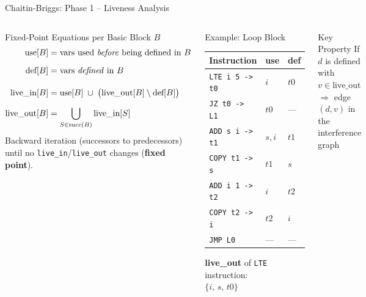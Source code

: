 \documentclass[aspectratio=169,11pt]{beamer}
\begin{document}
\begin{frame}{Chaitin-Briggs: Phase 1 -- Liveness Analysis}
\begin{columns}[t]
  \begin{block}{Fixed-Point Equations per Basic Block $B$}
    \bigskip
    \begin{align*}
      \text{use}[B]        &= \text{vars used \emph{before} being defined in }B\\[6pt]
      \text{def}[B]        &= \text{vars \emph{defined} in }B\\[10pt]
      \text{live\_in}[B]  &= \text{use}[B] \;\cup\;
                              \bigl(\text{live\_out}[B] \setminus \text{def}[B]\bigr)\\[6pt]
      \text{live\_out}[B] &= \bigcup_{S \in \text{succ}(B)} \text{live\_in}[S]
    \end{align*}
    \bigskip
    Backward iteration (successors to predecessors)\\
    until no \texttt{live\_in}/\texttt{live\_out} changes (\textbf{fixed point}).
  \end{block}

  \begin{exampleblock}{Example: Loop Block}
    \small
    \begin{tabular}{lll}
      \textbf{Instruction} & \textbf{use} & \textbf{def} \\
      \hline
      \texttt{LTE i 5 -> t0}  & $i$    & $t0$ \\
      \texttt{JZ  t0  -> L1}  & $t0$   & --- \\
      \texttt{ADD s i  -> t1} & $s, i$ & $t1$ \\
      \texttt{COPY t1 -> s}   & $t1$   & $s$  \\
      \texttt{ADD i 1  -> t2} & $i$    & $t2$ \\
      \texttt{COPY t2 -> i}   & $t2$   & $i$  \\
      \texttt{JMP L0}         & ---    & --- \\
    \end{tabular}

    \medskip
    \textbf{live\_out} of \texttt{LTE} instruction:\\
    $\{i,\, s,\, t0\}$
  \end{exampleblock}
  \begin{alertblock}{\small Key Property}
    \small If $d$ is defined with $v \in \text{live\_out}$\\
    $\Rightarrow$ edge $(d, v)$ in the interference graph
  \end{alertblock}
\end{columns}
\end{frame}
\end{document}

